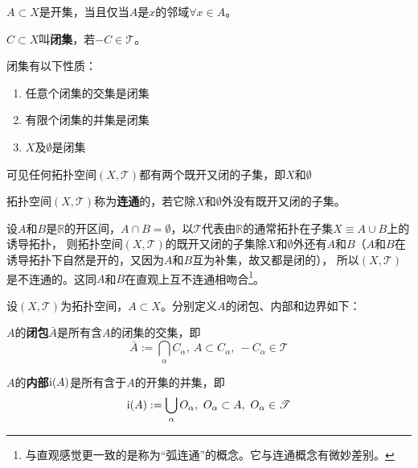 \begin{theorem}
$A \subset X$是开集，当且仅当$A$是$x$的邻域$\forall x \in A$。
\end{theorem}

\begin{definition}
$C \subset X$叫\textbf{闭集}，若$-C \in \mathscr{T}$。
\end{definition}

\begin{theorem}
闭集有以下性质：
\begin{enumerate}[（a）]
\item 任意个闭集的交集是闭集
\item 有限个闭集的并集是闭集
\item $X$及$\emptyset$是闭集
\end{enumerate}
\end{theorem}

可见任何拓扑空间$(X, \mathscr{T})$都有两个既开又闭的子集，即$X$和$\emptyset$

\begin{definition}
拓扑空间$(X, \mathscr{T})$称为\textbf{连通}的，若它除$X$和$\emptyset$外没有既开又闭的子集。
\end{definition}

\begin{example}
设$A$和$B$是$\mathbb{R}$的开区间，$A \cap B = \emptyset$，以$\mathscr{T}$代表由$\mathbb{R}$的通常拓扑在子集$X \equiv A \cup B$上的诱导拓扑，
则拓扑空间$(X, \mathscr{T})$的既开又闭的子集除$X$和$\emptyset$外还有$A$和$B$（$A$和$B$在诱导拓扑下自然是开的，又因为$A$和$B$互为补集，故又都是闭的），
所以$(X, \mathscr{T})$是不连通的。这同$A$和$B$在直观上互不连通相吻合\footnote{
与直观感觉更一致的是称为``弧连通''的概念。它与连通概念有微妙差别。
}。
\end{example}

设$(X, \mathscr{T})$为拓扑空间，$A \subset X$。分别定义$A$的闭包、内部和边界如下：

\begin{definition}
$A$的\textbf{闭包}$\bar{A}$是所有含$A$的闭集的交集，即
$$\bar{A} := \bigcap_\alpha C_\alpha, ~ A \subset C_\alpha, ~ -C_\alpha \in \mathscr{T}$$
\end{definition}

\begin{definition}
$A$的\textbf{内部}$\operatorname{i}(A)$是所有含于$A$的开集的并集，即
$$\operatorname{i}(A) := \bigcup_\alpha O_\alpha, ~ O_\alpha \subset A, ~ O_\alpha \in \mathscr{T}$$
\end{definition}

